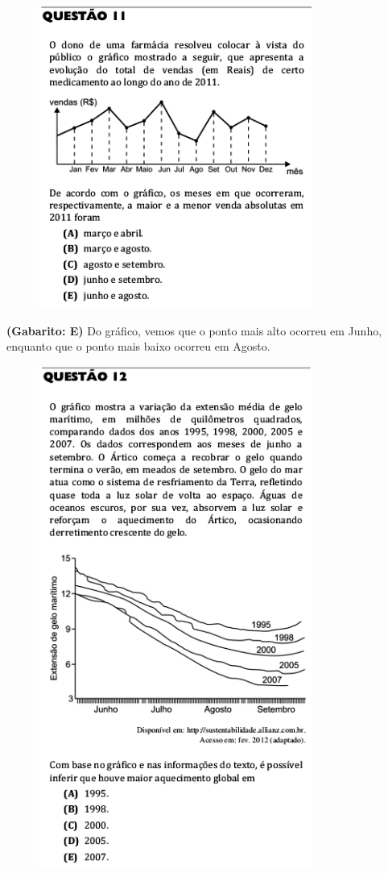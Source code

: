 \documentclass[a4paper]{article}
\begin{document}
\begin{figure}[H]
	\begin{center}
		\includegraphics[width=9cm]{L1Q11.png}
	\end{center}
\end{figure}
\par\textbf{(Gabarito: E)} Do gráfico, vemos que o ponto mais alto ocorreu em Junho, enquanto que o ponto mais baixo ocorreu em Agosto.
\begin{figure}[H]
	\begin{center}
		\includegraphics[width=9cm]{L1Q12.png}
	\end{center}
\end{figure}
\end{document}
